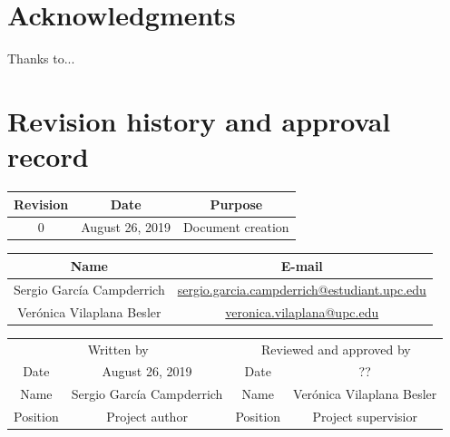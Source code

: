 \documentclass[a4paper,12pt,titlepage]{article}
\begin{document}
\section*{Acknowledgments}
Thanks to...
\thispagestyle{empty}

\section*{Revision history and approval record}
\begin{center}
\begin{tabular}{*3c}
\toprule
Revision & Date & Purpose \\
\midrule
0 & August 26, 2019 & Document creation \\
\bottomrule
\end{tabular}
\end{center}

\begin{center}
\begin{tabular}{*2c}
\toprule
Name & E-mail \\
\midrule
Sergio García Campderrich & \url{sergio.garcia.campderrich@estudiant.upc.edu} \\
Verónica Vilaplana Besler & \url{veronica.vilaplana@upc.edu} \\
\bottomrule
\end{tabular}
\end{center}

\begin{center}
\begin{tabular}{*4c}
\toprule
\multicolumn{2}{c}{Written by} & \multicolumn{2}{c}{Reviewed and approved by}\\
Date & August 26, 2019 & Date & ?? \\
\midrule
Name & Sergio García Campderrich & Name & Verónica Vilaplana Besler \\
Position & Project author & Position & Project supervisior \\
\bottomrule
\end{tabular}
\end{center}

\thispagestyle{empty}

\tableofcontents
\thispagestyle{empty}

\listoffigures
\thispagestyle{empty}

\listoftables
\thispagestyle{empty}

\newpage

\end{document}
